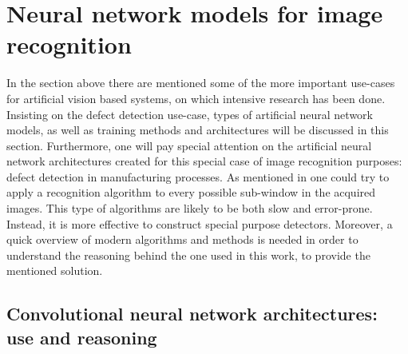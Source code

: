 \documentclass[12pt,a4paper,twoside]{report}
\begin{document}
\section{Neural network models for image recognition}

In the section above there are mentioned some of the more important use-cases for artificial vision based systems, on which intensive research has been done. Insisting on the defect detection use-case, types of artificial neural network models, as well as training methods and architectures will be discussed in this section. Furthermore, one will pay special attention on the artificial neural network architectures created for this special case of image recognition purposes: defect detection in manufacturing processes. As mentioned in \cite{article-cvapp} one could try to apply a recognition algorithm to every possible sub-window in the acquired images. This type of algorithms are likely to be both slow and error-prone. Instead, it is more effective to construct special purpose detectors. Moreover, a quick overview of modern algorithms and methods is needed in order to understand the reasoning behind the one used in this work, to provide the mentioned solution.

\subsection{Convolutional neural network architectures: use and reasoning}
\end{document}
